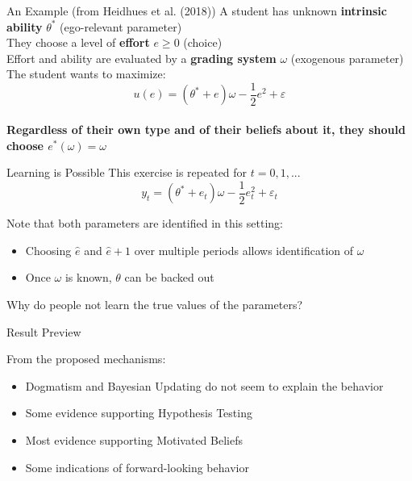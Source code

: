 \documentclass[aspectratio=169]{beamer}
\begin{document}
\begin{frame}{An Example (from Heidhues et al. (2018))}
    A student has unknown \textbf{intrinsic ability} $\theta^*$ (\alert{ego-relevant parameter})\\ 
    \bigskip
    They choose a level of \textbf{effort} $e\geq 0$ (\alert{choice}) \\
    \bigskip
    Effort and ability are evaluated by a \textbf{grading system} $\omega$ (\alert{exogenous parameter})\\
    \bigskip 
    The student wants to maximize:\\
        $$u(e) = (\theta^* + e)\omega-\frac{1}{2}e^2 +\varepsilon$$\\
    
    \bigskip
   \textbf{Regardless of their own type and of their beliefs about it, they should choose $e^*(\omega)=\omega$}\\

\end{frame}

\begin{frame}{Learning is Possible}
    This exercise is repeated for $t=0, 1, ...$
        $$y_t = (\theta^* + e_t)\omega-\frac{1}{2}e_t^2 +\varepsilon_t$$
    
    Note that both parameters are identified in this setting:\\
    \bigskip
    
    \begin{itemize}
        \item Choosing $\hat{e}$ and $\hat{e}+1$ over multiple periods allows identification of $\omega$\\
        \bigskip
        \item Once $\omega$ is known, $\theta$ can be backed out\\
     \end{itemize}
    \bigskip
    Why do people not learn the true values of the parameters?
\end{frame}

\begin{frame}{Result Preview}

    From the proposed mechanisms:
    \begin{itemize}
        \item \alert{Dogmatism} and \alert{Bayesian Updating} do not seem to explain the behavior
        \bigskip
        \item Some evidence supporting \alert{Hypothesis Testing}
        \bigskip
        \item Most evidence supporting \alert{Motivated Beliefs}
        \bigskip
        \item Some indications of forward-looking behavior
    \end{itemize}

\end{frame}
\end{document}
